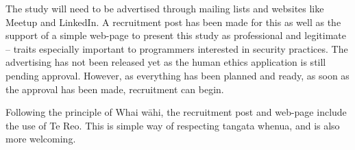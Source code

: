 \par The study will need to be advertised through mailing lists and websites like Meetup and LinkedIn. A recruitment post has been made for this as well as the support of a simple web-page \cite{webpage} to present this study as professional and legitimate – traits especially important to programmers interested in security practices. The advertising has not been released yet as the human ethics application is still pending approval. However, as everything has been planned and ready, as soon as the approval has been made, recruitment can begin. 
\newline
\par Following the principle of Whai wāhi, the recruitment post and web-page include the use of Te Reo. This is simple way of respecting tangata whenua, and is also more welcoming. 







